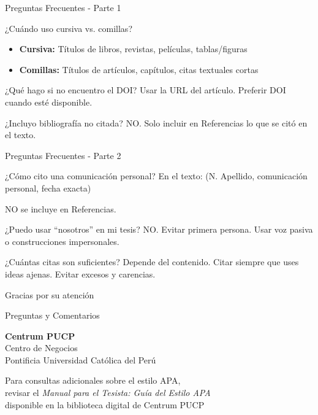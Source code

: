 \documentclass[spanish,aspectratio=169]{beamer}
\begin{document}
\begin{frame}{Preguntas Frecuentes - Parte 1}
	\begin{block}{¿Cuándo uso cursiva vs. comillas?}
		\begin{itemize}
			\item \textbf{Cursiva:} Títulos de libros, revistas, películas, tablas/figuras
			\item \textbf{Comillas:} Títulos de artículos, capítulos, citas textuales cortas
		\end{itemize}
	\end{block}
	
	\begin{block}{¿Qué hago si no encuentro el DOI?}
		Usar la URL del artículo. Preferir DOI cuando esté disponible.
	\end{block}
	
	\begin{block}{¿Incluyo bibliografía no citada?}
		NO. Solo incluir en Referencias lo que se citó en el texto.
	\end{block}
\end{frame}

\begin{frame}{Preguntas Frecuentes - Parte 2}
	\begin{block}{¿Cómo cito una comunicación personal?}
		En el texto: (N. Apellido, comunicación personal, fecha exacta)
		
		NO se incluye en Referencias.
	\end{block}
	
	\begin{block}{¿Puedo usar ``nosotros'' en mi tesis?}
		NO. Evitar primera persona. Usar voz pasiva o construcciones impersonales.
	\end{block}
	
	\begin{block}{¿Cuántas citas son suficientes?}
		Depende del contenido. Citar siempre que uses ideas ajenas. Evitar excesos y carencias.
	\end{block}
\end{frame}

\begin{frame}
	\begin{center}
		{\Huge Gracias por su atención}
		
		\vspace{1cm}
		
		{\Large Preguntas y Comentarios}
		
		\vspace{1.5cm}
		
		\textbf{Centrum PUCP}\\
		Centro de Negocios\\
		Pontificia Universidad Católica del Perú
		
		\vspace{0.5cm}
		
		\small
		Para consultas adicionales sobre el estilo APA,\\
		revisar el \textit{Manual para el Tesista: Guía del Estilo APA}\\
		disponible en la biblioteca digital de Centrum PUCP
	\end{center}
\end{frame}
\end{document}
